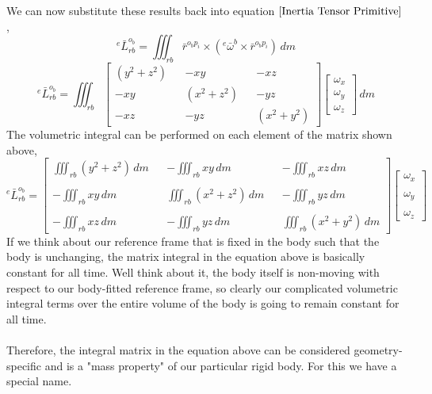 We can now substitute these results back into equation $\ref{Inertia Tensor Primitive}$,
$${}^{e}\bar{L}^{o_{b}}_{rb} = \iiint^{}_{rb} \bar{r}^{o_{b}p_{i}}\times\left({}^{e}\bar{\omega}^{b}\times\bar{r}^{o_{b}p_{i}}\right) \,dm $$
$${}^{e}\bar{L}^{o_{b}}_{rb} = \iiint^{}_{rb} \begin{bmatrix}
(y^{2}+z^{2}) && - xy &&  - xz \\ 
-xy && (x^{2}+z^{2}) && - yz \\
-xz && - yz && (x^{2}+y^{2})
\end{bmatrix}\begin{bmatrix}
\omega_{x} \\ \omega_{y} \\ \omega_{z}
\end{bmatrix} \,dm $$
The volumetric integral can be performed on each element of the matrix shown above,
\begin{equation}{}^{e}\bar{L}^{o_{b}}_{rb} = 
\begin{bmatrix}
\iiint^{}_{rb} (y^{2}+z^{2}) \,dm && - \iiint^{}_{rb} xy \,dm &&  - \iiint^{}_{rb} xz \,dm \\~\\ 
-\iiint^{}_{rb} xy \,dm && \iiint^{}_{rb} (x^{2}+z^{2}) \,dm && -\iiint^{}_{rb} yz \,dm \\~\\
-\iiint^{}_{rb} xz \,dm && - \iiint^{}_{rb} yz \,dm && \iiint^{}_{rb} (x^{2}+y^{2}) \,dm 
\end{bmatrix}\begin{bmatrix}
\omega_{x} \\~\\ \omega_{y} \\~\\ \omega_{z}
\end{bmatrix} \label{Inertia Tensor Primitive 2}\end{equation}
If we think about our reference frame that is fixed in the body such that the body is unchanging, the matrix integral in the equation above is basically constant for all time.
Well think about it, the body itself is non-moving with respect to our body-fitted reference frame, so clearly our complicated volumetric integral terms over the entire volume of the body is going to remain constant for all time.
\\~\\Therefore, the integral matrix in the equation above can be considered geometry-specific and is a "mass property" of our particular rigid body. 
For this we have a special name. 
